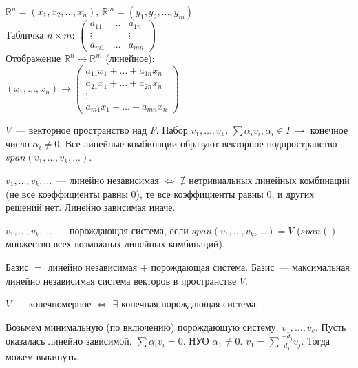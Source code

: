 \documentclass{article}
\begin{document}
	$\mathbb{R}^n = (x_1, x_2, \dots, x_n)$, $\mathbb{R}^m = (y_1, y_2, \dots, y_m)$ \\
	Табличка $n \times m$: $\left(
	\begin{smallmatrix}
		a_{11} & \dots & a_{1n} \\
		\vdots &  & \vdots \\
		a_{m1} & \dots & a_{mn}
	\end{smallmatrix}
	\right)$ \\
	Отображение $\mathbb{R}^n \rightarrow \mathbb{R}^m$ (линейное): \\
	$(x_1, \dots, x_n) \rightarrow \left(
	\begin{smallmatrix}
		a_{11}x_1 + \dots + a_{1n}x_n \\
		a_{21}x_1 + \dots + a_{2n}x_n \\
		\vdots \\
		a_{m1}x_1 + \dots + a_{mn}x_n
	\end{smallmatrix}
	\right)$
	\begin{definition}
		$V$~--- векторное пространство над $F$. Набор $v_1, \dots, v_k$. $\sum \alpha_i v_i, \alpha_i \in F \rightarrow$ конечное число $\alpha_i \not= 0$. Все линейные комбинации образуют векторное подпространство $span(v_1, \dots, v_k, \dots)$.
	\end{definition}
	\begin{definition}
		$v_1, \dots, v_k, \dots$~--- линейно независимая $\Leftrightarrow$ $\nexists$ нетривиальных линейных комбинаций (не все коэффициенты равны $0$), те все коэффициенты равны $0$, и других решений нет. Линейно зависимая иначе.
	\end{definition}
	\begin{definition}
		$v_1, \dots, v_k, \dots$~--- порождающая система, если $span(v_1, \dots, v_k, \dots) = V$ ($span()$~--- множество всех возможных линейных комбинаций).
	\end{definition}
	\begin{definition}
		Базис $=$ линейно независимая $+$ порождающая система. Базис~--- максимальная линейно независимая система векторов в пространстве $V$.
	\end{definition}
	\begin{definition}
		$V$~--- конечномерное $\Leftrightarrow$ $\exists$ конечная порождающая система.
	\end{definition}
	\noindent
	Возьмем минимальную (по включению) порождающую систему. $v_1, \dots, v_e$. Пусть оказалась линейно зависимой. $\sum \alpha_i v_i = 0$. НУО $\alpha_1 \not= 0$. $v_1 = \sum \frac{-d_j}{d_1} v_j$. Тогда можем выкинуть. \\
\end{document}
